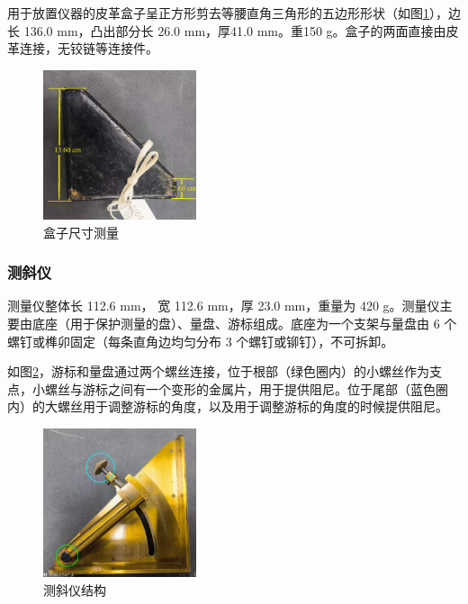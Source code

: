 \documentclass[UTF8]{ctexart}
\begin{document}
用于放置仪器的皮革盒子呈正方形剪去等腰直角三角形的五边形形状（如图\ref{fig:box_surface_measure}），边长 136.0 mm，凸出部分长 26.0 mm，厚41.0 mm。重150 g。盒子的两面直接由皮革连接，无铰链等连接件。

\begin{figure}[h]
    \centering
    \includegraphics[width=0.4\textwidth]{img/box_surface_measure.jpg}
    \caption{盒子尺寸测量}
    \label{fig:box_surface_measure}
\end{figure}

\subsubsection{测斜仪}

测量仪整体长 112.6 mm， 宽 112.6 mm，厚 23.0 mm，重量为 420 g。测量仪主要由底座（用于保护测量的盘）、量盘、游标组成。底座为一个支架与量盘由 6 个螺钉或榫卯固定（每条直角边均匀分布 3 个螺钉或铆钉），不可拆卸。

如图\ref{fig:clinometer_structure_face_undisassembled}，游标和量盘通过两个螺丝连接，位于根部（绿色圈内）的小螺丝作为支点，小螺丝与游标之间有一个变形的金属片，用于提供阻尼。位于尾部（蓝色圈内）的大螺丝用于调整游标的角度，以及用于调整游标的角度的时候提供阻尼。

\begin{figure}[h]
    \centering
    \includegraphics[width=0.4\textwidth]{img/clinometer_structure_face_undisassembled}
    \caption{测斜仪结构}
    \label{fig:clinometer_structure_face_undisassembled}
\end{figure}
\end{document}
